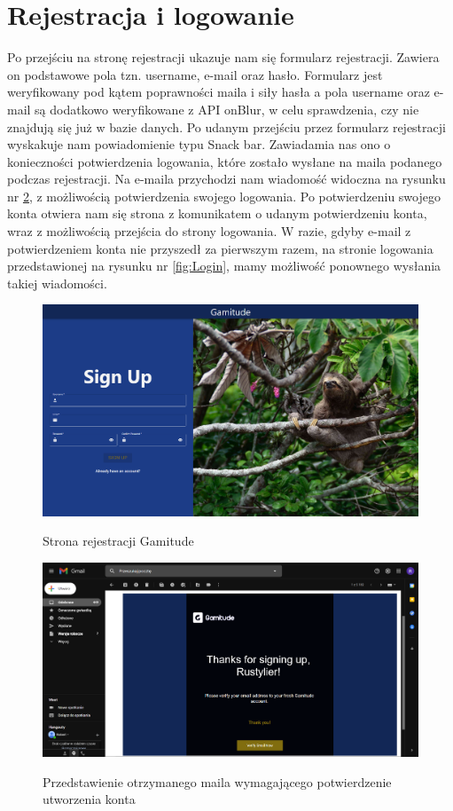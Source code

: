 \documentclass[a4paper,11pt]{report}
\begin{document}
\section{Rejestracja i logowanie}
Po przejściu na stronę rejestracji ukazuje nam się formularz rejestracji. Zawiera on podstawowe pola tzn. username, e-mail oraz hasło.
Formularz jest weryfikowany pod kątem poprawności maila i siły hasła
 a pola username oraz e-mail są dodatkowo weryfikowane z API onBlur, w celu sprawdzenia, czy nie znajdują się już w bazie danych. 
Po udanym przejściu przez formularz rejestracji wyskakuje nam powiadomienie typu Snack bar. 
Zawiadamia nas ono o konieczności potwierdzenia logowania, które zostało wysłane na maila podanego podczas rejestracji.
Na e-maila przychodzi nam wiadomość widoczna na rysunku nr \ref{fig:Email}, z możliwością potwierdzenia swojego logowania.
Po potwierdzeniu swojego konta otwiera nam się strona z komunikatem o udanym potwierdzeniu konta, wraz z możliwością przejścia do strony logowania.
W razie, gdyby e-mail z potwierdzeniem konta nie przyszedł za pierwszym razem,
 na stronie logowania przedstawionej na rysunku nr \ref{fig:Login}, mamy możliwość ponownego wysłania takiej wiadomości.
\begin{figure}[H]
	\centering
	\includegraphics[scale=0.3]{prezentacja/Register}\\
	\caption{Strona rejestracji Gamitude}
	\label{fig:Register}
\end{figure}
\begin{figure}[H]
	\centering
	\includegraphics[scale=0.3]{prezentacja/Email}\\
	\caption{Przedstawienie otrzymanego maila wymagającego potwierdzenie utworzenia konta}
	\label{fig:Email}
\end{figure}
\end{document}
